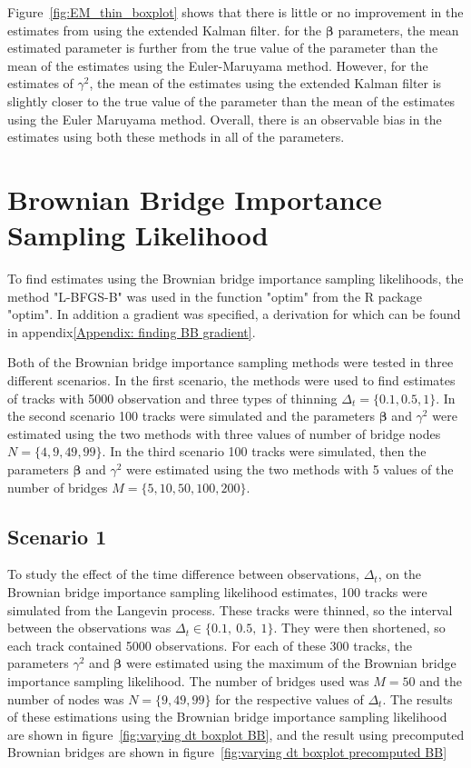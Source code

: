 Figure~\ref{fig:EM_thin_boxplot} shows that there is little or no improvement in the estimates from using the extended Kalman filter. for the $\bm \beta$ parameters, the mean estimated parameter is further from the true value of the parameter than the mean of the estimates using the Euler-Maruyama method. However, for the estimates of $\gamma^2$, the mean of the estimates using the extended Kalman filter is slightly closer to the true value of the parameter than the mean of the estimates using the Euler Maruyama method. Overall, there is an observable bias in the estimates using both these methods in all of the parameters.

\section{Brownian Bridge Importance Sampling Likelihood}
\label{sec: BB test}
To find estimates using the Brownian bridge importance sampling likelihoods, the method "L-BFGS-B" was used in the function "optim" from the R package "optim". In addition a gradient was specified, a derivation for which can be found in appendix\ref{Appendix: finding BB gradient}. 


Both of the Brownian bridge importance sampling methods were tested in three different scenarios. In the first scenario, the methods were used to find estimates of tracks with 5000 observation and three types of thinning $\Delta_t =\{0.1, 0.5, 1\}$. In the second scenario 100 tracks were simulated and the parameters $\bm \beta$ and $\gamma^2$ were estimated using the two methods with three values of number of bridge nodes $N=\{4, 9, 49, 99\}$. In the third scenario 100 tracks were simulated, then the parameters $\bm \beta$ and $\gamma^2$ were estimated using the two methods with 5 values of the number of bridges $M=\{5,10,50,100,200\}$. 


\subsection{Scenario 1}
To study the effect of the time difference between observations, $\Delta_t$, on the Brownian bridge importance sampling likelihood estimates, 100 tracks were simulated from the Langevin process. These tracks were thinned, so the interval between the observations was $\Delta_t \in \{0.1, \ 0.5, \ 1\}$. They were then shortened, so each track contained 5000 observations. For each of these 300 tracks, the parameters $\gamma^2$ and $\bm \beta$ were estimated using the maximum of the Brownian bridge importance sampling likelihood. The number of bridges used was $M=50$ and the number of nodes was $N =\{9,49,99\}$ for the respective values of $\Delta_t$. The results of these estimations using the Brownian bridge importance sampling likelihood are shown in figure~\ref{fig:varying dt boxplot BB}, and the result using precomputed Brownian bridges are shown in figure~\ref{fig:varying dt boxplot precomputed BB}


